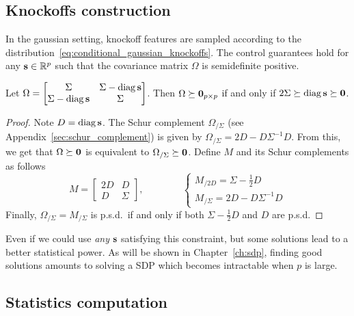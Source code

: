 \subsection{Knockoffs construction}\label{subsec:bot_sdp}

In the gaussian setting,
knockoff features are sampled according to the distribution~\ref{eq:conditional_gaussian_knockoffs}.
The control guarantees hold for any $\mathbf{s} \in \mathbb{R}^p$ such that the covariance matrix $\Omega$ is semidefinite positive.
\begin{proposition}\label{prop:omega_psd}
    Let $\Omega = \begin{bmatrix}
        \Sigma & \Sigma - \operatorname*{diag} \mathbf{s}\\
        \Sigma - \operatorname*{diag} \mathbf{s} & \Sigma
    \end{bmatrix}$.
    Then $\Omega \succeq \mathbf{0}_{p \times p}$ if and only if $2\Sigma \succeq \operatorname*{diag} \mathbf{s} \succeq \mathbf{0}$.
\end{proposition}
\begin{proof}
    Note $D = \operatorname*{diag}\mathbf{s}$.
    The Schur complement $\Omega_{/\Sigma}$ (see Appendix~\ref{sec:schur_complement}) is given by
    $\Omega_{/\Sigma} = 2D - D\Sigma^{-1}D$.
    From this, we get that $\Omega \succeq \mathbf{0}$ is equivalent to $\Omega_{/\Sigma} \succeq \mathbf{0}$.
    Define $M$ and its Schur complements as follows
    \begin{equation*}
        M = \begin{bmatrix}
            2D & D\\
            D & \Sigma
        \end{bmatrix}
        ,\qquad\qquad
        \begin{cases*}
            M_{/2D} = \Sigma - \frac{1}{2}D\\
            M_{/\Sigma} = 2D - D\Sigma^{-1}D
        \end{cases*}
    \end{equation*}
    Finally, $\Omega_{/\Sigma} = M_{/\Sigma}$ is p.s.d.\ if and only if both $\Sigma - \frac{1}{2}D$ and $D$ are p.s.d.
\end{proof}
Even if we could use \emph{any} $\mathbf{s}$ satisfying this constraint,
but some solutions lead to a better statistical power.
As will be shown in Chapter~\ref{ch:sdp},
finding good solutions amounts to solving a SDP which becomes intractable when $p$ is large.

\subsection{Statistics computation}\label{subsec:bot_stats}

